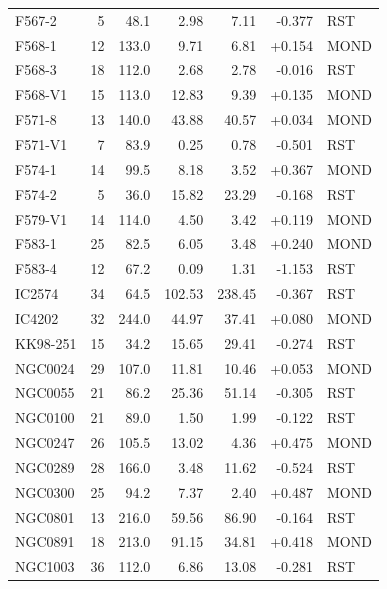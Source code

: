 \documentclass[11pt,a4paper]{article}
\begin{document}
\begin{longtable}{lrrrrrl}
F567-2               &   5 &   48.1 &     2.98 &     7.11 & -0.377 & RST \\
F568-1               &  12 &  133.0 &     9.71 &     6.81 & +0.154 & MOND \\
F568-3               &  18 &  112.0 &     2.68 &     2.78 & -0.016 & RST \\
F568-V1              &  15 &  113.0 &    12.83 &     9.39 & +0.135 & MOND \\
F571-8               &  13 &  140.0 &    43.88 &    40.57 & +0.034 & MOND \\
F571-V1              &   7 &   83.9 &     0.25 &     0.78 & -0.501 & RST \\
F574-1               &  14 &   99.5 &     8.18 &     3.52 & +0.367 & MOND \\
F574-2               &   5 &   36.0 &    15.82 &    23.29 & -0.168 & RST \\
F579-V1              &  14 &  114.0 &     4.50 &     3.42 & +0.119 & MOND \\
F583-1               &  25 &   82.5 &     6.05 &     3.48 & +0.240 & MOND \\
F583-4               &  12 &   67.2 &     0.09 &     1.31 & -1.153 & RST \\
IC2574               &  34 &   64.5 &   102.53 &   238.45 & -0.367 & RST \\
IC4202               &  32 &  244.0 &    44.97 &    37.41 & +0.080 & MOND \\
KK98-251             &  15 &   34.2 &    15.65 &    29.41 & -0.274 & RST \\
NGC0024              &  29 &  107.0 &    11.81 &    10.46 & +0.053 & MOND \\
NGC0055              &  21 &   86.2 &    25.36 &    51.14 & -0.305 & RST \\
NGC0100              &  21 &   89.0 &     1.50 &     1.99 & -0.122 & RST \\
NGC0247              &  26 &  105.5 &    13.02 &     4.36 & +0.475 & MOND \\
NGC0289              &  28 &  166.0 &     3.48 &    11.62 & -0.524 & RST \\
NGC0300              &  25 &   94.2 &     7.37 &     2.40 & +0.487 & MOND \\
NGC0801              &  13 &  216.0 &    59.56 &    86.90 & -0.164 & RST \\
NGC0891              &  18 &  213.0 &    91.15 &    34.81 & +0.418 & MOND \\
NGC1003              &  36 &  112.0 &     6.86 &    13.08 & -0.281 & RST \\

\end{longtable}
\end{document}
